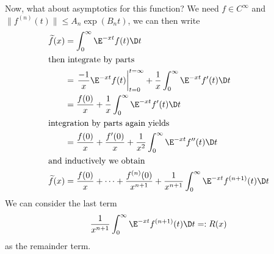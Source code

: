 Now, what about asymptotics for this function? We need $f\in
C^{\infty}$ and $\|f^{(n)}(t)\|\leq A_{n}\exp(B_{n}t)$, we can
then write
\begin{subequations}
\begin{align}
\widetilde{f}(x) &= \int^{\infty}_{0}\E^{-xt}f(t)\D t\\
\intertext{then integrate by parts}
&=\left.\frac{-1}{x}\E^{-xt}f(t)\right|^{t=\infty}_{t=0}
+\frac{1}{x}\int^{\infty}_{0}\E^{-xt}f'(t)\D t\\
&=\frac{f(0)}{x}+\frac{1}{x}\int^{\infty}_{0}\E^{-xt}f'(t)\D t\\
\intertext{integration by parts again yields}
&=\frac{f(0)}{x}+\frac{f'(0)}{x}+\frac{1}{x^{2}}\int^{\infty}_{0}\E^{-xt}f''(t)\D t\\
\intertext{and inductively we obtain}
\widetilde{f}(x)&=\frac{f(0)}{x}+\dots+\frac{f^{(n)}(0)}{x^{n+1}}+\frac{1}{x^{n+1}}\int^{\infty}_{0}\E^{-xt}f^{(n+1)}(t)\D t
\end{align}
\end{subequations}
We can consider the last term
\begin{equation}
\frac{1}{x^{n+1}}\int^{\infty}_{0}\E^{-xt}f^{(n+1)}(t)\D t=:R(x)
\end{equation}
as the remainder term.


